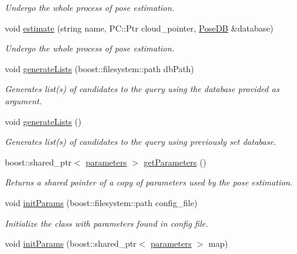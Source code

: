 \begin{DoxyCompactItemize}
\begin{DoxyCompactList}\small\item\em Undergo the whole process of pose estimation. \end{DoxyCompactList}\item 
void \hyperlink{classPoseEstimation_aefe59360460c9cc61f9de4f7beed2a1c}{estimate} (string name, P\-C\-::\-Ptr cloud\-\_\-pointer, \hyperlink{classPoseDB}{Pose\-D\-B} \&database)
\begin{DoxyCompactList}\small\item\em Undergo the whole process of pose estimation. \end{DoxyCompactList}\item 
void \hyperlink{classPoseEstimation_a7f16094de53753e91efa3d4728a928be}{generate\-Lists} (boost\-::filesystem\-::path db\-Path)
\begin{DoxyCompactList}\small\item\em Generates list(s) of candidates to the query using the database provided as argument. \end{DoxyCompactList}\item 
void \hyperlink{classPoseEstimation_aa240b7ff2e362aa091f531ebd34359ad}{generate\-Lists} ()
\begin{DoxyCompactList}\small\item\em Generates list(s) of candidates to the query using previously set database. \end{DoxyCompactList}\item 
boost\-::shared\-\_\-ptr$<$ \hyperlink{group__Definitions_gacbb28d8f791bb363852e522cf3b83c47}{parameters} $>$ \hyperlink{classPoseEstimation_a12d8c28c86296c5dada321647e71c462}{get\-Parameters} ()
\begin{DoxyCompactList}\small\item\em Returns a shared pointer of a copy of parameters used by the pose estimation. \end{DoxyCompactList}\item 
void \hyperlink{classPoseEstimation_a8359f6ffae7fc0cf99692d926dd1e7c4}{init\-Params} (boost\-::filesystem\-::path config\-\_\-file)
\begin{DoxyCompactList}\small\item\em Initialize the class with parameters found in config file. \end{DoxyCompactList}\item 
void \hyperlink{classPoseEstimation_afb35622cd6540f66913896e0bc5f5bd0}{init\-Params} (boost\-::shared\-\_\-ptr$<$ \hyperlink{group__Definitions_gacbb28d8f791bb363852e522cf3b83c47}{parameters} $>$ map)

\end{DoxyCompactItemize}
